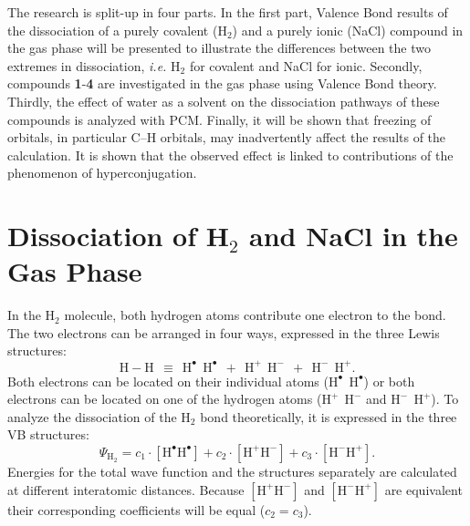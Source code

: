 The research is split-up in four parts.  In the first part, Valence Bond results of the dissociation of a purely covalent (H$_2$) and a purely ionic (NaCl) compound in the gas phase will be presented to illustrate the differences between the two extremes in dissociation, \textit{i.e.} H$_2$ for covalent and NaCl for ionic. Secondly, compounds \textbf{1}-\textbf{4} are investigated in the gas phase using Valence Bond theory. Thirdly, the effect of water as a solvent on the dissociation pathways of these compounds is analyzed with PCM. Finally, it will be shown that freezing of orbitals, in particular C--H orbitals, may inadvertently affect the results of the calculation. It is shown that the observed effect is linked to contributions of the phenomenon of hyperconjugation.

\section{Dissociation of H$_2$ and NaCl in the Gas Phase}

In the H$_2$ molecule, both hydrogen atoms contribute one electron to the bond. The two electrons can be arranged in four ways, expressed in the three Lewis structures:
\begin{equation}
\nonumber
\mathrm{H-H\ \ \equiv \ \ H^{\bullet}\ \ H^{\bullet}\ \ +\ \ H^{+}\ \ H^{-}\ \ +\ \ H^{-}\ \ H^{+}}.
\end{equation}
Both electrons can be located on their individual atoms ($\mathrm{H^{\bullet}\ \ H^{\bullet}}$) or both electrons can be located on one of the hydrogen atoms ($\mathrm{H^{+}\ \ H^{-}}$ and $\mathrm{H^{-}\ \ H^{+}}$). To analyze the dissociation of the H$_2$ bond theoretically, it is expressed in the three VB structures:
\begin{equation}
\nonumber
\Psi_{\mathrm{H_2}} = c_1\cdot [\mathrm{H}^\bullet \mathrm{H}^\bullet] + c_2 \cdot [\mathrm{H}^{+}\mathrm{H}^{-}] + c_3 \cdot [\mathrm{H}^{-}\mathrm{H}^{+}]. 
\end{equation}
Energies for the total wave function and the structures separately are calculated at different interatomic distances. Because $[\mathrm{H}^{+}\mathrm{H}^{-}]$ and $[\mathrm{H}^{-}\mathrm{H}^{+}]$ are equivalent their corresponding coefficients will be equal ($c_2 = c_3$).  

